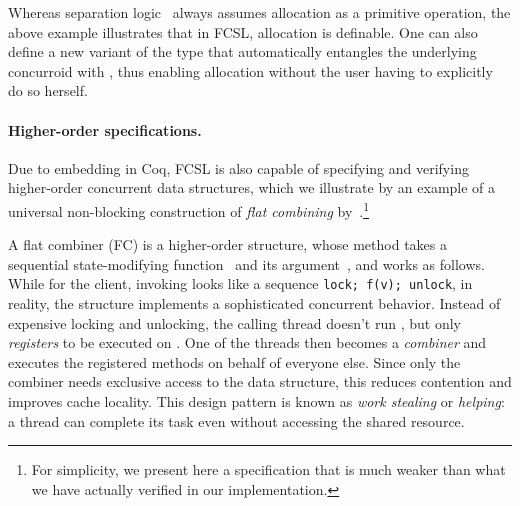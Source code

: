 Whereas separation logic~\cite{Reynolds:LICS02} always assumes
allocation as a primitive operation, the above example illustrates
that in FCSL, allocation is definable. One can also define a new
variant of the  type that automatically entangles the
underlying concurroid with , thus enabling allocation
without the user having to explicitly do so herself.

\paragraph{Higher-order specifications.~~}
\label{sec:high-order-spec}

Due to embedding in Coq, FCSL is also capable of specifying and
verifying higher-order concurrent data structures, which we illustrate
by an example of a universal non-blocking construction of \emph{flat
  combining} by~\citet{Hendler-al:SPAA10}.\footnote{For simplicity, we
  present here a specification that is much weaker than what we have
  actually verified in our implementation.}

A flat combiner (FC) is a higher-order structure, whose method
 takes a sequential state-modifying
function~ and its argument~, and works as
follows. While for the client, invoking  looks
like a sequence \texttt{\small{lock; f(v); unlock}}, in reality, the
structure implements a sophisticated concurrent
behavior. Instead of expensive locking and unlocking, the calling
thread doesn't run , but only \emph{registers}  to be
executed on . One of the threads then becomes a
\emph{combiner} and executes the registered methods on behalf of
everyone else. Since only the combiner needs exclusive access to the
data structure, this reduces contention and improves cache
locality. This design pattern is known as \emph{work stealing} or
\emph{helping}: a thread can complete its task even without accessing
the shared resource.

